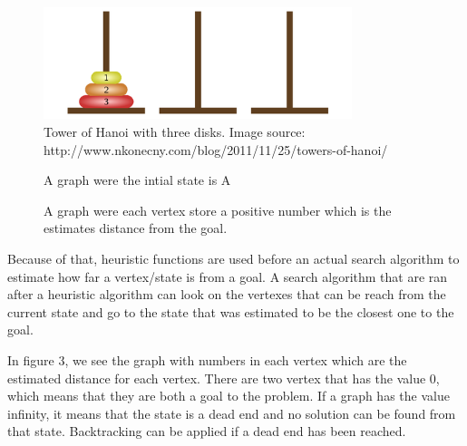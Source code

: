 \documentclass[cropmarks, frame, english]{idamasterthesis}
\begin{document}
\begin{figure}
\centering
\includegraphics[width=90mm]{towers-of-hanoi.png}
\caption{Tower of Hanoi with three disks. Image source: http://www.nkonecny.com/blog/2011/11/25/towers-of-hanoi/  \label{towers-of-hanoi}}
\end{figure}


\begin{figure}
\caption{A graph were the intial state is A \label{plan_graph} }
\end{figure}

\begin{figure}
\caption{A graph were each vertex store a positive number which is the estimates distance from the goal. \label{heurstic_graph} }
\end{figure}





Because of that, heuristic functions are used before an actual search algorithm to estimate how far a vertex/state is from a goal. A search algorithm that are ran after a heuristic algorithm can look on the vertexes that can be reach from the current state and go to the state that was estimated to be the closest one to the goal.

In figure 3, we see the graph with numbers in each vertex which are the estimated distance for each vertex. There are two vertex that has the value 0, which means that they are both a goal to the problem. If a graph has the value  infinity, it means that the state is a dead end and no solution can be found from that state. Backtracking can be  applied if a dead end has been reached. 
\end{document}
